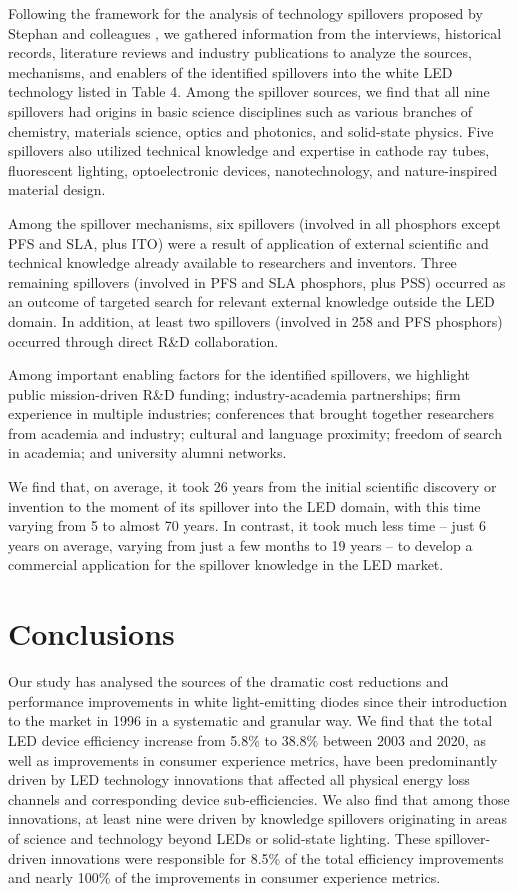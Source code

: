 \documentclass[twoside,twocolumn,9pt]{article}
\begin{document}
Following the framework for the analysis of technology spillovers proposed by Stephan and colleagues \cite{Stephan2021}, we gathered information from the interviews, historical records, literature reviews and industry publications to analyze the sources, mechanisms, and enablers of the identified spillovers into the white LED technology listed in Table 4. Among the spillover sources, we find that all nine spillovers had origins in basic science disciplines such as various branches of chemistry, materials science, optics and photonics, and solid-state physics. Five spillovers also utilized technical knowledge and expertise in cathode ray tubes, fluorescent lighting, optoelectronic devices, nanotechnology, and nature-inspired material design. 

Among the spillover mechanisms, six spillovers (involved in all phosphors except PFS and SLA, plus ITO) were a result of application of external scientific and technical knowledge already available to researchers and inventors. Three remaining spillovers (involved in PFS and SLA phosphors, plus PSS) occurred as an outcome of targeted search for relevant external knowledge outside the LED domain. In addition, at least two spillovers (involved in 258 and PFS phosphors) occurred through direct R\&D collaboration.

Among important enabling factors for the identified spillovers, we highlight public mission-driven R\&D funding; industry-academia partnerships; firm experience in multiple industries; conferences that brought together researchers from academia and industry; cultural and language proximity; freedom of search in academia; and university alumni networks.

We find that, on average, it took 26 years from the initial scientific discovery or invention to the moment of its spillover into the LED domain, with this time varying from 5 to almost 70 years. In contrast, it took much less time – just 6 years on average, varying from just a few months to 19 years – to develop a commercial application for the spillover knowledge in the LED market. 

\section{Conclusions}

Our study has analysed the sources of the dramatic cost reductions and performance improvements in white light-emitting diodes since their introduction to the market in 1996 in a systematic and granular way. We find that the total LED device efficiency increase from 5.8\% to 38.8\% between 2003 and 2020, as well as improvements in consumer experience metrics, have been predominantly driven by LED technology innovations that affected all physical energy loss channels and corresponding device sub-efficiencies. We also find that among those innovations, at least nine were driven by knowledge spillovers originating in areas of science and technology beyond LEDs or solid-state lighting. These spillover-driven innovations were responsible for 8.5\% of the total efficiency improvements and nearly 100\% of the improvements in consumer experience metrics. 
\end{document}
